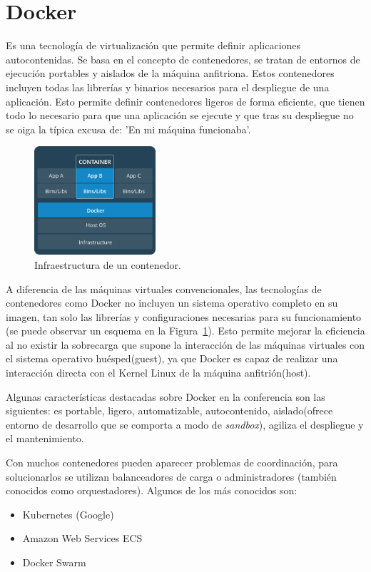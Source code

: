 \vspace{1cm}
\section{Docker }\label{sec:docker}
Es una tecnología de virtualización que permite definir aplicaciones autocontenidas. Se basa en el concepto de contenedores, se tratan de entornos de ejecución portables y aislados de la máquina anfitriona. Estos contenedores incluyen todas las librerías y binarios necesarios para el despliegue de una aplicación. Esto permite definir contenedores ligeros de forma eficiente, que tienen todo lo necesario para que una aplicación se ejecute y que tras su despliegue no se oiga la típica excusa de: 'En mi máquina funcionaba'.

\begin{figure}
\centering
\includegraphics[width=0.4\textwidth]{container.png}
\caption{\label{fig:cont}Infraestructura de un contenedor.}
\end{figure}

A diferencia de las máquinas virtuales convencionales, las tecnologías de contenedores como Docker no incluyen un sistema operativo completo en su imagen, tan solo las librerías y configuraciones necesarias para su funcionamiento (se puede observar un esquema en la Figura~\ref{fig:cont}). Esto permite mejorar la eficiencia al no existir la sobrecarga que supone la interacción de las máquinas virtuales con el sistema operativo huésped(guest), ya que Docker es capaz de realizar una interacción directa con el Kernel Linux de la máquina anfitrión(host).

Algunas características destacadas sobre Docker en la conferencia son las siguientes: es portable, ligero, automatizable, autocontenido, aislado(ofrece entorno de desarrollo que se comporta a modo de \textit{sandbox}), agiliza el despliegue y el mantenimiento.

Con muchos contenedores pueden aparecer problemas de coordinación, para solucionarlos se utilizan balanceadores de carga o administradores (también conocidos como orquestadores). Algunos de los más conocidos son:
\begin{itemize}
\item Kubernetes (Google)
\item Amazon Web Services ECS
\item Docker Swarm
\end{itemize}

